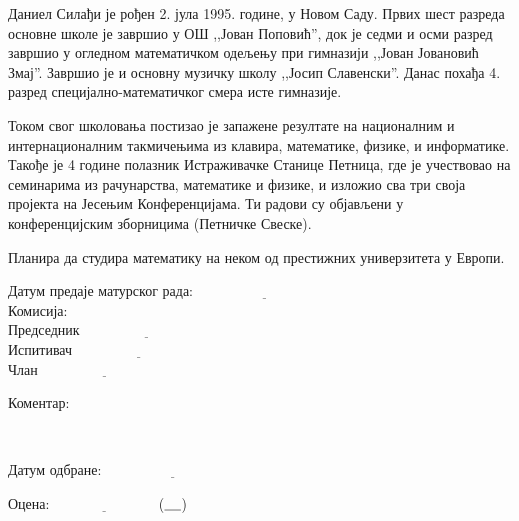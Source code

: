 \documentclass{report}
\theoremstyle{plain}
\theoremstyle{definition}
\begin{document}
Даниел Силађи је рођен 2. јула 1995. године, у Новом Саду. Првих шест разреда основне школе је завршио у ОШ ,,Јован Поповић'', док је седми и осми разред завршио у огледном математичком одељењу при гимназији ,,Јован Јовановић Змај''. Завршио је и основну музичку школу ,,Јосип Славенски''. Данас похађа 4. разред специјално-математичког смера исте гимназије.

Током свог школовања постизао је запажене резултате на националним и интернационалним такмичењима из клавира, математике, физике, и информатике. Такође је 4 године полазник Истраживачке Станице Петница, где је учествовао на семинарима из рачунарства, математике и физике, и изложио сва три своја пројекта на Јесењим Конференцијама. Ти радови су објављени у конференцијским зборницима (Петничке Свеске).

Планира да студира математику на неком од престижних универзитета у Европи.

\newpage

\hspace{-5.3cm} Датум предаје матурског рада: $\underline{\hspace{4cm}}$\\[1cm]
Комисија:\\[2mm]
\hspace*{1cm}Председник\hspace{5mm}$\underline{\hspace{4cm}}$\\[2mm]
\hspace*{1cm}Испитивач\hspace{6.7mm}$\underline{\hspace{4cm}}$\\[2mm]
\hspace*{1cm}Члан\hspace{18.3mm}$\underline{\hspace{4cm}}$\\[1cm]
\begin{minipage}{0.2\linewidth}
\vspace{-9cm}
Коментар:
\end{minipage}
\begin{minipage}{0.8\linewidth}
\vspace{4mm}
\hspace{-1.2cm}
\fbox{
\begin{minipage}{5in}
\hfill\vspace{3in}
\end{minipage}}
\end{minipage}\\[1cm]
\begin{minipage}{0.5\linewidth}
\begin{flushleft}
Датум одбране: $\underline{\hspace{4cm}}$
\end{flushleft}
\end{minipage}
\begin{minipage}{0.5\linewidth}
\begin{flushright}
Оцена: $\underline{\hspace{3cm}}$ ($\underline{\hspace{0.4cm}}$)
\end{flushright}
\end{minipage}
\end{document}
